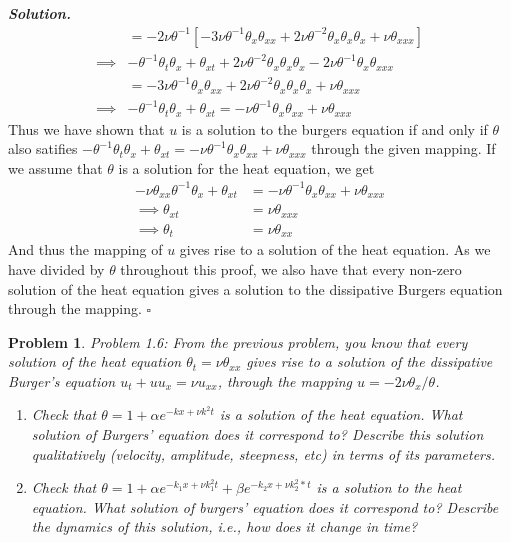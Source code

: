 \documentclass[12pt]{report}
\newtheorem{problem}{Problem}
\newenvironment{solution}[1][\it{Solution}]{\textbf{#1. } }{$\square$}
\begin{document}
\begin{solution}
\begin{align*}
        &= -2\nu\theta^{-1}\left[ -3\nu\theta^{-1}\theta_x\theta_{xx} + 2\nu\theta^{-2}\theta_{x}\theta_{x}\theta_{x} + \nu\theta_{xxx}\right]\\
        \implies &-\theta^{-1}\theta_t\theta_x + \theta_{xt} + 2\nu\theta^{-2}\theta_x\theta_x\theta_x - 2\nu \theta^{-1}\theta_x\theta_{xxx}\\
        &= -3\nu\theta^{-1}\theta_x\theta_{xx} + 2\nu\theta^{-2}\theta_{x}\theta_{x}\theta_{x} + \nu\theta_{xxx}\\
        \implies &-\theta^{-1}\theta_{t}\theta_x + \theta_{xt} = -\nu \theta^{-1} \theta_x \theta_{xx} + \nu \theta_{xxx}
    \end{align*}
    Thus we have shown that $u$ is a solution to the burgers equation if and only if $\theta$ also satifies $-\theta^{-1}\theta_{t}\theta_x + \theta_{xt} = -\nu \theta^{-1} \theta_x \theta_{xx} + \nu \theta_{xxx}$ through the given mapping.
    If we assume that $\theta$ is a solution for the heat equation, we get
    \begin{align*}
        -\nu \theta_{xx}\theta^{-1}\theta_x + \theta_{xt} &= -\nu \theta^{-1} \theta_x \theta_{xx} + \nu \theta_{xxx}\\
        \implies \theta_{xt} &= \nu\theta_{xxx}\\
        \implies \theta_{t} &= \nu\theta_{xx}
    \end{align*} 
    And thus the mapping of $u$ gives rise to a solution of the heat equation. As we have divided by $\theta$ throughout this proof, we also have that every non-zero solution of the heat equation gives a solution to the dissipative Burgers equation through the mapping.  
\end{solution}

\newpage



\begin{problem}
    Problem 1.6: From the previous problem, you know that every solution of the heat equation $\theta_t = \nu\theta_{xx}$ gives rise to a solution of the dissipative Burger's equation $u_t + uu_x = \nu u_{xx}$, through the mapping $u = -2\nu\theta_x/\theta$.
    \begin{enumerate}
        \item Check that $\theta = 1 + \alpha e^{-kx+\nu k^2 t}$ is a solution of the heat equation. What solution of Burgers' equation does it correspond to? Describe this solution qualitatively (velocity, amplitude, steepness, etc) in terms of its parameters. 
        \item Check that $\theta = 1 + \alpha e^{-k_1x+\nu k_1^2 t} + \beta e^{-k_2x + \nu k_2^2*t}$ is a solution to the heat equation. What solution of burgers' equation does it correspond to? Describe the dynamics of this solution, i.e., how does it change in time?
    \end{enumerate}
\end{problem}
\end{document}

